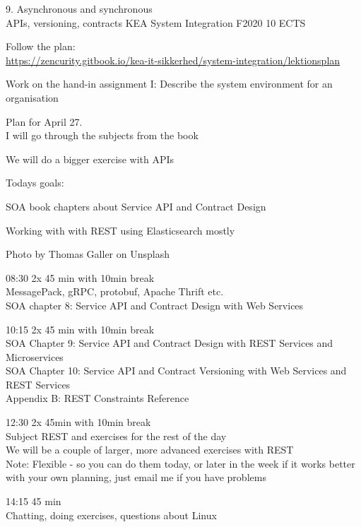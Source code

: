 \documentclass[Screen16to9,17pt]{foils}
\begin{document}
\mytitlepage
{9. Asynchronous and synchronous\\
 APIs, versioning, contracts}
{KEA System Integration F2020 10 ECTS}



\begin{list2}
\item Follow the plan:\\
\url{https://zencurity.gitbook.io/kea-it-sikkerhed/system-integration/lektionsplan}
\item Work on the hand-in assignment I: Describe the system environment for an organisation
\item Plan for April 27.\\
I will go through the subjects from the book
\item We will do a bigger exercise with APIs
\end{list2}



Todays goals:
\begin{list2}
\item SOA book chapters about Service API and Contract Design
\item Working with with REST using Elasticsearch mostly
\end{list2}

Photo by Thomas Galler on Unsplash


\begin{list2}
\item 08:30 2x 45 min with 10min break\\
MessagePack, gRPC, protobuf, Apache Thrift etc.\\
SOA chapter 8: Service API and Contract Design
with Web Services
\item 10:15 2x 45 min with 10min break\\
SOA Chapter 9: Service API and Contract Design with
REST Services and Microservices\\
SOA Chapter 10: Service API and Contract Versioning
with Web Services and REST Services\\
Appendix B: REST Constraints Reference
\item 12:30 2x 45min with 10min break \\
Subject REST and exercises for the rest of the day\\
We will be a couple of larger, more advanced exercises with REST\\
Note: Flexible - so you can do them today, or later in the week if it works better with your own planning, just email me if you have problems \smiley
\item 14:15 45 min\\
Chatting, doing exercises, questions about Linux
\end{list2}
\end{document}
